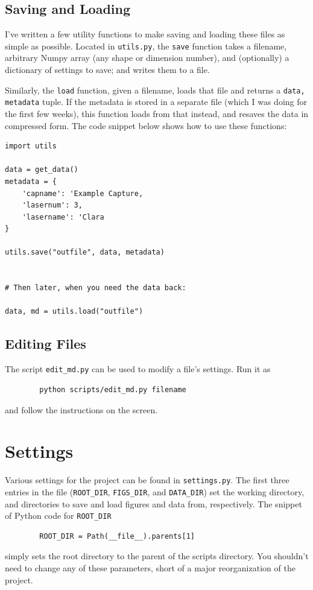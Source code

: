 \documentclass{article}
\newcommand{\code}{\lstinline}
\begin{document}
    \subsection{Saving and Loading}
    I've written a few utility functions to make saving and loading these files as simple as possible. Located in \code{utils.py}, the \code{save} function takes a filename, arbitrary Numpy array (any shape or dimension number), and (optionally) a dictionary of settings to save; and writes them to a file.

    Similarly, the \code{load} function, given a filename, loads that file and returns a \code{data, metadata} tuple. If the metadata is stored in a separate file (which I was doing for the first few weeks), this function loads from that instead, and resaves the data in compressed form. The code snippet below shows how to use these functions: 

    \begin{lstlisting}
import utils

data = get_data()
metadata = {
    'capname': 'Example Capture,
    'lasernum': 3,
    'lasername': 'Clara
}

utils.save("outfile", data, metadata)


# Then later, when you need the data back:

data, md = utils.load("outfile")
    \end{lstlisting}

    \subsection{Editing Files}
    The script \code{edit_md.py} can be used to modify a file's settings. Run it as
    \begin{lstlisting}
        python scripts/edit_md.py filename
    \end{lstlisting}
    and follow the instructions on the screen.

    \section{Settings}
    Various settings for the project can be found in \code{settings.py}. The first three entries in the file (\code{ROOT_DIR}, \code{FIGS_DIR}, and \code{DATA_DIR}) set the working directory, and directories to save and load figures and data from, respectively. The snippet of Python code for \code{ROOT_DIR}
    \begin{lstlisting}
        ROOT_DIR = Path(__file__).parents[1]
    \end{lstlisting}
    simply sets the root directory to the parent of the scripts directory. You shouldn't need to change any of these parameters, short of a major reorganization of the project.
\end{document}
